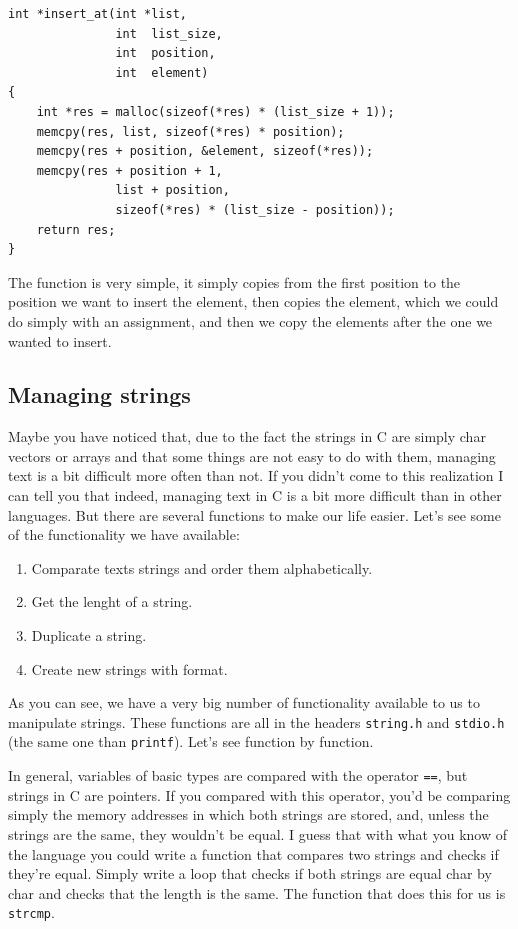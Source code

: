\documentclass[a4paper]{article}
\begin{document}
\noindent
\begin{minipage}[H]{\linewidth}
\mbox{}
\begin{lstlisting}[style=C,
caption={Utilización de la función \texttt{memcpy}},
label={lst:memcpyExample}]
int *insert_at(int *list,
               int  list_size,
               int  position,
               int  element)
{
    int *res = malloc(sizeof(*res) * (list_size + 1));
    memcpy(res, list, sizeof(*res) * position);
    memcpy(res + position, &element, sizeof(*res));
    memcpy(res + position + 1,
               list + position,
               sizeof(*res) * (list_size - position));
    return res;
}
\end{lstlisting}
\end{minipage}

The function is very simple, it simply copies from the first position to the
position we want to insert the element, then copies the element, which we could
do simply with an assignment, and then we copy the elements after the one we
wanted to insert.

\subsection{Managing strings}
Maybe you have noticed that, due to the fact the strings in C are simply char
vectors or arrays and that some things are not easy to do with them, managing
text is a bit difficult more often than not. If you didn't come to this
realization I can tell you that indeed, managing text in C is a bit more
difficult than in other languages. But there are several functions to make our
life easier. Let's see some of the functionality we have available:
\begin{enumerate}
\item Comparate texts strings and order them alphabetically.
\item Get the lenght of a string.
\item Duplicate a string.
\item Create new strings with format.
\end{enumerate}

As you can see, we have a very big number of functionality available to us to
manipulate strings. These functions are all in the headers \verb!string.h! and
\verb!stdio.h! (the same one than \verb!printf!). Let's see function by
function.

In general, variables of basic types are compared with the operator \verb!==!,
but strings in C are pointers. If you compared with this operator, you'd be
comparing simply the memory addresses in which both strings are stored, and,
unless the strings are the same, they wouldn't be equal. I guess that with what
you know of the language you could write a function that compares two strings
and checks if they're equal. Simply write a loop that checks if both strings
are equal char by char and checks that the length is the same.
The function that does this for us is \verb!strcmp!.
\end{document}
